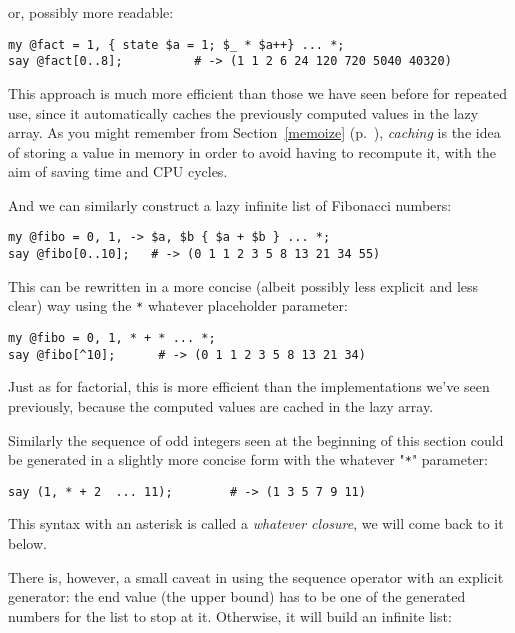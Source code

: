 or, possibly more readable:

\begin{verbatim}
my @fact = 1, { state $a = 1; $_ * $a++} ... *;
say @fact[0..8];          # -> (1 1 2 6 24 120 720 5040 40320)
\end{verbatim}


This approach is much more efficient than those we have 
seen before for repeated use, since it automatically 
caches the previously computed values in the lazy array. 
As you might remember from Section~\ref{memoize} 
(p.~\pageref{memoize}), \emph{caching} is the idea of 
storing a value in memory in order to avoid having to 
recompute it, with the aim of saving time and CPU cycles.

And we can similarly construct a lazy infinite list of 
Fibonacci numbers:

\begin{verbatim}
my @fibo = 0, 1, -> $a, $b { $a + $b } ... *;
say @fibo[0..10];   # -> (0 1 1 2 3 5 8 13 21 34 55)
\end{verbatim}

This can be rewritten in a more concise (albeit possibly 
less explicit and less clear) way using the \verb'*' 
whatever placeholder parameter:

\begin{verbatim}
my @fibo = 0, 1, * + * ... *;
say @fibo[^10];      # -> (0 1 1 2 3 5 8 13 21 34)
\end{verbatim}

Just as for factorial, this is more efficient than the 
implementations we've seen previously, because the 
computed values are cached in the lazy array.

Similarly the sequence of odd integers seen at the 
beginning of this section could be generated in a 
slightly more concise form with the whatever "\verb'*'" 
parameter:

\begin{verbatim}
say (1, * + 2  ... 11);        # -> (1 3 5 7 9 11)
\end{verbatim}

This syntax with an asterisk is called a 
\emph{whatever closure}, we will come back to 
it below.

There is, however, a small caveat in using the sequence operator with 
an explicit generator: the end value (the upper bound) has 
to be one of the generated numbers for the list to stop at 
it. Otherwise, it will build an infinite list:

